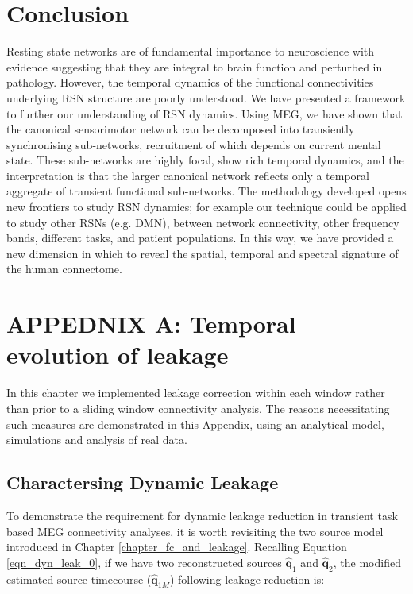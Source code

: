\section{Conclusion} 
Resting state networks are of fundamental importance to neuroscience with evidence suggesting that they are integral to brain function and perturbed in pathology. However, the temporal dynamics of the functional connectivities underlying RSN structure are poorly understood. We have presented a framework to further our understanding of RSN dynamics. Using MEG, we have shown that the canonical sensorimotor network can be decomposed into transiently synchronising sub-networks, recruitment of which depends on current mental state. These sub-networks are highly focal, show rich temporal dynamics, and the interpretation is that the larger canonical network reflects only a temporal aggregate of transient functional sub-networks. The methodology developed opens new frontiers to study RSN dynamics; for example our technique could be applied to study other RSNs (e.g. DMN), between network connectivity, other frequency bands, different tasks, and patient populations. In this way, we have provided a new dimension in which to reveal the spatial, temporal and spectral signature of the human connectome.

\clearpage

\appsection
\section{APPEDNIX A: Temporal evolution of leakage}\label{sec_dyn_leak}

In this chapter we implemented leakage correction within each window rather than prior to a sliding window connectivity analysis. The reasons necessitating such measures are demonstrated in this Appendix, using an analytical model, simulations and analysis of real data.

\subsection{Charactersing Dynamic Leakage}
To demonstrate the requirement for dynamic leakage reduction in transient task based MEG connectivity analyses, it is worth revisiting the two source model introduced in Chapter \ref{chapter_fc_and_leakage}. Recalling Equation \ref{eqn_dyn_leak_0}, if we have two reconstructed sources $\hat{\mathbf{q}}_1$ and $\hat{\mathbf{q}}_2$, the modified estimated source timecourse ($\hat{\mathbf{q}}_{1M}$) following leakage reduction is:


